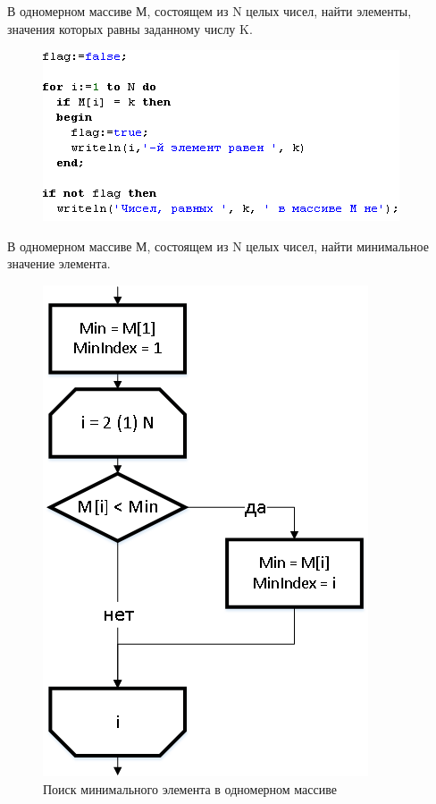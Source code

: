 \documentclass{beamer}
\begin{document}
\begin{frame}
В одномерном массиве М, состоящем из N целых чисел, найти элементы, значения которых равны заданному числу K.
\begin{figure}[h]
\centering
\includegraphics[scale=1.0]{images/array_search_code.png}
\label{pic-search-code}
\end{figure}
\end{frame}

\begin{frame}
В одномерном массиве М, состоящем из N целых чисел, найти минимальное значение элемента.
\begin{figure}[h]
\centering
\includegraphics[scale=0.35]{images/array_min.png}
\caption{Поиск минимального элемента в одномерном массиве}
\label{pic-search}
\end{figure}
\end{frame}
\end{document}
